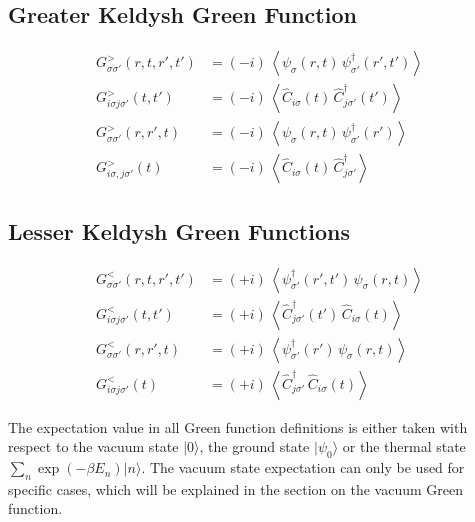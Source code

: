 \subsection*{Greater Keldysh Green Function}
\begin{align}
    G^{>}_{\sigma\sigma'}(r,t,r',t') &= (-i)\, \left\langle \psi_{\sigma}(r,t)\, \psi_{\sigma'}^{\dagger}(r',t') \right\rangle \\[1ex]
    G^{>}_{i\sigma j\sigma'}(t,t') &= (-i)\, \left\langle \hat{C}_{i\sigma}(t)\, \hat{C}_{j\sigma'}^{\dagger}(t') \right\rangle \\[1ex]
    G^{>}_{\sigma\sigma'}(r,r',t) &= (-i)\, \left\langle \psi_{\sigma}(r,t)\, \psi_{\sigma'}^{\dagger}(r') \right\rangle \\[1ex]
    G^{>}_{i\sigma,j\sigma'}(t) &= (-i)\, \left\langle \hat{C}_{i\sigma}(t)\, \hat{C}_{j\sigma'}^{\dagger} \right\rangle
\end{align}

\subsection*{Lesser Keldysh Green Functions}
\begin{align}
    G^{<}_{\sigma\sigma'}(r,t,r',t') &= (+i)\, \left\langle \psi_{\sigma'}^{\dagger}(r',t')\, \psi_{\sigma}(r,t) \right\rangle \\[1ex]
    G^{<}_{i\sigma j\sigma'}(t,t') &= (+i)\, \left\langle \hat{C}_{j\sigma'}^{\dagger}(t')\, \hat{C}_{i\sigma}(t) \right\rangle \\[1ex]
    G^{<}_{\sigma\sigma'}(r,r',t) &= (+i)\, \left\langle \psi_{\sigma'}^{\dagger}(r')\, \psi_{\sigma}(r,t) \right\rangle \\[1ex]
    G^{<}_{i\sigma j\sigma'}(t) &= (+i)\, \left\langle \hat{C}_{j\sigma'}^{\dagger}\, \hat{C}_{i\sigma}(t) \right\rangle
\end{align}

The expectation value in all Green function definitions is either taken with respect to the vacuum state $|0\rangle$, the ground state $|\psi_0\rangle$ or the thermal state $\sum_n \exp(-\beta E_n) |n\rangle$.
The vacuum state expectation can only be used for specific cases, which will be explained in the section on the vacuum Green function.

